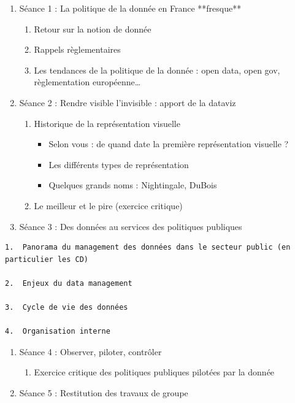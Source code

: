 \documentclass[
  letterpaper,
  DIV=11,
  numbers=noendperiod]{scrreprt}
\providecommand{\tightlist}{%
  \setlength{\itemsep}{0pt}\setlength{\parskip}{0pt}}\usepackage{longtable,booktabs,array}
\begin{document}
\begin{enumerate}
\def\labelenumi{\arabic{enumi}.}
\item
  Séance 1 : La politique de la donnée en France **fresque**

  \begin{enumerate}
  \def\labelenumii{\arabic{enumii}.}
  \item
    Retour sur la notion de donnée
  \item
    Rappels règlementaires
  \item
    Les tendances de la politique de la donnée : open data, open gov,
    règlementation européenne\ldots{}
  \end{enumerate}
\item
  Séance 2 : Rendre visible l'invisible : apport de la dataviz

  \begin{enumerate}
  \def\labelenumii{\arabic{enumii}.}
  \item
    Historique de la représentation visuelle

    \begin{itemize}
    \item
      Selon vous : de quand date la première représentation visuelle ?
    \item
      Les différents types de représentation
    \item
      Quelques grands noms : Nightingale, DuBois
    \end{itemize}
  \item
    Le meilleur et le pire (exercice critique)
  \end{enumerate}
\item
  Séance 3 : Des données au services des politiques publiques
\end{enumerate}

\begin{verbatim}
1.  Panorama du management des données dans le secteur public (en particulier les CD)

2.  Enjeux du data management

3.  Cycle de vie des données

4.  Organisation interne
\end{verbatim}

\begin{enumerate}
\def\labelenumi{\arabic{enumi}.}
\setcounter{enumi}{3}
\item
  Séance 4 : Observer, piloter, contrôler

  \begin{enumerate}
  \def\labelenumii{\arabic{enumii}.}
  \tightlist
  \item
    Exercice critique des politiques publiques pilotées par la donnée
  \end{enumerate}
\item
  Séance 5 : Restitution des travaux de groupe
\end{enumerate}
\end{document}
